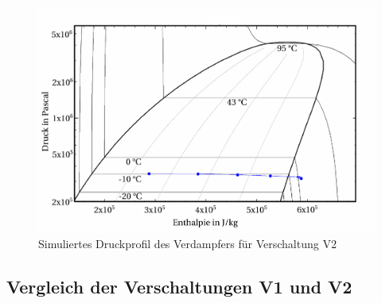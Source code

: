 \begin{figure}[h!]
\centering
\includegraphics[scale=0.55]{Pictures/test61V2logph.pdf}
\caption{Simuliertes Druckprofil des Verdampfers für Verschaltung V2}
\label{fig:SimDruckV2}
\end{figure}



\subsection{Vergleich der Verschaltungen V1 und V2}
\label{subsec:Vergleich der Verschaltungen V1 und V2}

